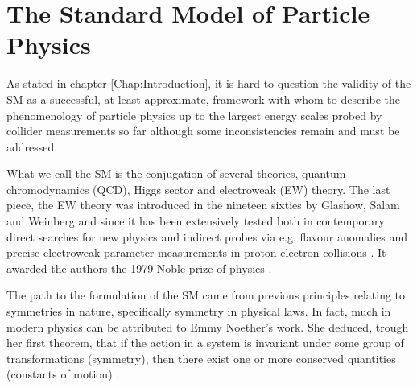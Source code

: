 
\chapter{The Standard Model of Particle Physics}
\label{Chap:SM}

%
%


As stated in chapter \ref{Chap:Introduction}, it is hard to question the validity of the SM as a successful, at least approximate, framework with whom to describe the phenomenology of particle physics up to the largest energy scales probed by collider measurements so far although some inconsistencies remain and must be addressed.  

What we call the SM is the conjugation of several theories, quantum chromodynamics (QCD), Higgs sector and electroweak (EW) theory. The last piece, the EW theory was introduced in the nineteen sixties by Glashow, Salam and Weinberg \cite{SALAM1964168} and since it has been extensively tested both in contemporary direct searches for new physics and indirect probes via e.g. flavour anomalies and precise electroweak parameter measurements in proton-electron collisions \cite{Gr_newald_2008}. It awarded the authors the 1979 Noble prize of physics \cite{NobelPrize:2009-Physics}.  
%

The path to the formulation of the SM came from previous principles relating to symmetries in nature, specifically symmetry in physical laws. 
%
In fact, much in modern physics can be attributed to Emmy Noether's work. She deduced, trough her first theorem, that if the action in a system is invariant under some group of transformations (symmetry), then there exist one or more conserved quantities (constants of motion) \cite{doi:10.1080/00411457108231446}. 

